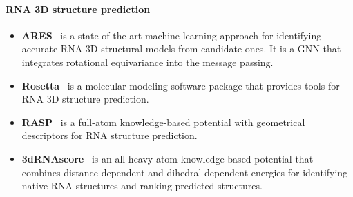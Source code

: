 \documentclass[fleqn,10pt]{wlscirep}
\begin{document}
\paragraph{RNA 3D structure prediction}
\begin{itemize}[leftmargin=10pt]
\item \textbf{ARES}~\cite{townshend2021geometric} is a state-of-the-art machine learning approach for identifying accurate RNA 3D structural models from candidate ones. It is a GNN that integrates rotational equivariance into the message passing.
\item \textbf{Rosetta}~\cite{watkins2020farfar2} is a molecular modeling software package that provides tools for RNA 3D structure prediction.
\item \textbf{RASP}~\cite{capriotti2011all} is a full-atom knowledge-based potential with geometrical descriptors for RNA structure prediction.
\item \textbf{3dRNAscore}~\cite{wang20153drnascore} is an all-heavy-atom knowledge-based potential that combines distance-dependent and dihedral-dependent energies for identifying native RNA structures and ranking predicted structures. 
\end{itemize}
\end{document}
